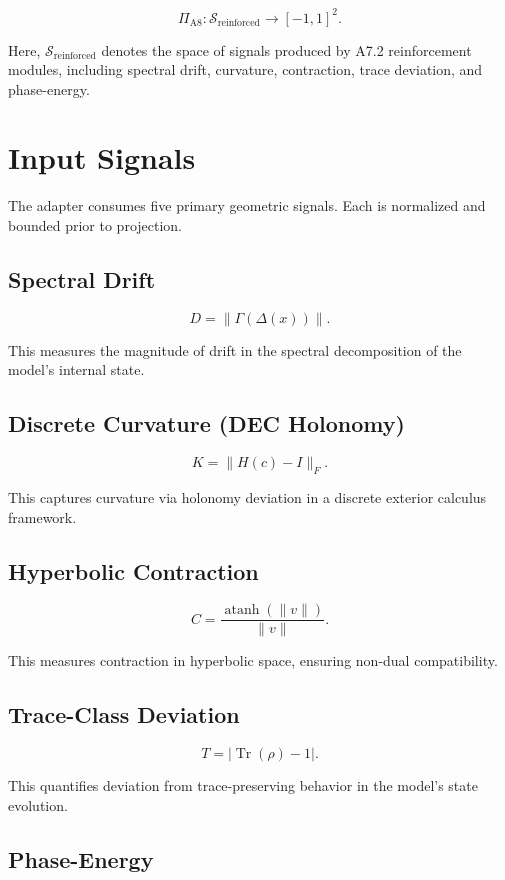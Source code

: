 \documentclass[11pt]{article}
\begin{document}
\[
\Pi_{\text{A8}} : \mathcal{S}_{\text{reinforced}} \rightarrow [-1,1]^2.
\]

Here, $\mathcal{S}_{\text{reinforced}}$ denotes the space of signals produced 
by A7.2 reinforcement modules, including spectral drift, curvature, contraction, 
trace deviation, and phase-energy.

\section{Input Signals}

The adapter consumes five primary geometric signals. Each is normalized and 
bounded prior to projection.

\subsection{Spectral Drift}

\[
D = \|\Gamma(\Delta(x))\|.
\]

This measures the magnitude of drift in the spectral decomposition of the 
model's internal state.

\subsection{Discrete Curvature (DEC Holonomy)}

\[
K = \|H(c) - I\|_F.
\]

This captures curvature via holonomy deviation in a discrete exterior calculus 
framework.

\subsection{Hyperbolic Contraction}

\[
C = \frac{\operatorname{atanh}(\|v\|)}{\|v\|}.
\]

This measures contraction in hyperbolic space, ensuring non-dual compatibility.

\subsection{Trace-Class Deviation}

\[
T = |\operatorname{Tr}(\rho) - 1|.
\]

This quantifies deviation from trace-preserving behavior in the model's 
state evolution.

\subsection{Phase-Energy}
\end{document}
